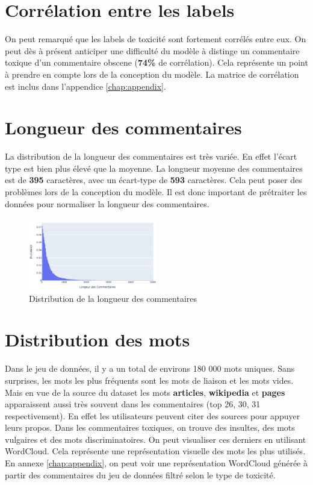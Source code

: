 \newpage
\section*{Corrélation entre les labels}
On peut remarqué que les labels de toxicité sont fortement corrélés entre eux. 
On peut dès à présent anticiper une difficulté du modèle à distinge un commentaire toxique d'un commentaire obscene (\textbf{74\%} de corrélation).
Cela représente un point à prendre en compte lors de la conception du modèle. La matrice de corrélation est inclus dans l'appendice \ref{chap:appendix}. 

\section*{Longueur des commentaires}
La distribution de la longueur des commentaires est très variée. En effet l'écart type est bien plus élevé que la moyenne. 
La longueur moyenne des commentaires est de \textbf{395} caractères, avec un écart-type de \textbf{593} caractères. 
Cela peut poser des problèmes lors de la conception du modèle. Il est donc important de prétraiter les données pour normaliser la longueur des commentaires.
\begin{figure}[h]
    \centering
    \includegraphics[width=0.5\textwidth]{figures/long-commentaire-prob.png}
    \caption{Distribution de la longueur des commentaires}
\end{figure}

\section*{Distribution des mots}
Dans le jeu de données, il y a un total de environs 180 000 mots uniques. 
Sans surprises, les mots les plus fréquents sont les mots de liaison et les mots vides. 
Mais en vue de la source du dataset les mots \textbf{articles}, \textbf{wikipedia} et \textbf{pages} apparaissent aussi très souvent dans les commentaires (top 26, 30, 31 respectivement).
En effet les utilisateurs peuvent citer des sources pour appuyer leurs propos. 
Dans les commentaires toxiques, on trouve des insultes, des mots vulgaires et des mots discriminatoires.
On peut visualiser ces derniers en utilisant WordCloud. Cela représente une représentation visuelle des mots les plus utilisés.
En annexe \ref{chap:appendix}, on peut voir une représentation WordCloud générée à partir des commentaires du jeu de données filtré selon le type de toxicité.
